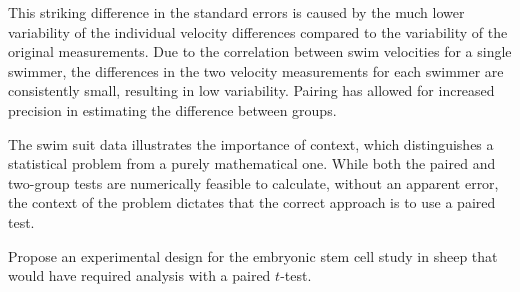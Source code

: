 This striking difference in the standard errors is caused by the much lower variability of the individual velocity differences compared to the variability of the original measurements. Due to the correlation between swim velocities for a single swimmer, the differences in the two velocity measurements for each swimmer are consistently small, resulting in low variability. Pairing has allowed for increased precision in estimating the difference between groups.

The swim suit data illustrates the importance of context, which distinguishes a statistical problem from a purely mathematical one. While both the paired and two-group tests are numerically feasible to calculate, without an apparent error, the context of the problem dictates that the correct approach is to use a paired test.

\begin{exercisewrap}
\begin{nexercise}
Propose an experimental design for the embryonic stem cell study in sheep that would have required analysis with a paired $t$-test.\footnotemark{}
\end{nexercise}
\end{exercisewrap}







